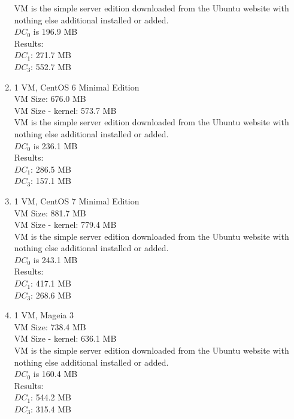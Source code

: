 \begin{enumerate}
VM is the simple server edition downloaded from the Ubuntu website with nothing else additional installed or added.\\

$DC_0$ is 196.9 MB\\
Results:\\
$DC_1$: 271.7 MB\\
$DC_3$: 552.7 MB\\
\item 1 VM, CentOS 6 Minimal Edition\\
VM Size: 676.0 MB\\
VM Size - kernel: 573.7 MB\\

VM is the simple server edition downloaded from the Ubuntu website with nothing else additional installed or added.\\

$DC_0$ is 236.1 MB\\
Results:\\
$DC_1$: 286.5 MB\\
$DC_3$: 157.1 MB\\
\item 1 VM, CentOS 7 Minimal Edition\\
VM Size: 881.7 MB\\
VM Size - kernel: 779.4 MB\\

VM is the simple server edition downloaded from the Ubuntu website with nothing else additional installed or added.\\

$DC_0$ is 243.1 MB\\
Results:\\
$DC_1$: 417.1 MB\\
$DC_3$: 268.6 MB\\
\item 1 VM, Mageia 3\\
VM Size: 738.4 MB\\
VM Size - kernel: 636.1 MB\\

VM is the simple server edition downloaded from the Ubuntu website with nothing else additional installed or added.\\

$DC_0$ is 160.4 MB\\
Results:\\
$DC_1$: 544.2 MB\\
$DC_3$: 315.4 MB\\


\end{enumerate}
